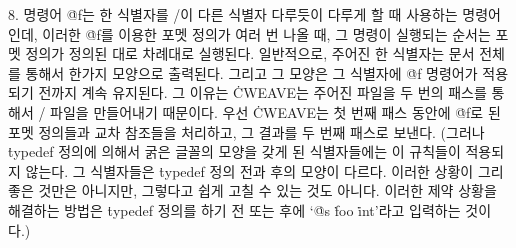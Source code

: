 8. 명령어 \.{@f}는 한 식별자를 \TEX/이 다른 식별자 다루듯이 다루게 할 때 사용하는
명령어인데, 이러한 \.{@f}를 이용한 포멧 정의가  여러 번 나올 때, 그 명령이 실행되는 순서는
포멧 정의가 정의된 대로 차례대로 실행된다. 일반적으로, 주어진 한 식별자는 문서 전체를 통해서
한가지 모양으로 출력된다. 그리고 그 모양은 그 식별자에 \.{@f} 명령어가 적용되기 전까지 계속
유지된다. 그 이유는 \.{CWEAVE}는 주어진 파일을 두 번의 패스를 통해서 \TEX/ 파일을
만들어내기 때문이다. 우선 \.{CWEAVE}는 첫 번째 패스 동안에 \.{@f}로 된 포멧 정의들과
교차 참조들을 처리하고, 그 결과를 두 번째 패스로 보낸다. (그러나 \.{typedef} 정의에 의해서
굵은 글꼴의 모양을 갖게 된 식별자들에는 이 규칙들이 적용되지 않는다. 그 식별자들은
\.{typedef} 정의 전과 후의 모양이 다르다. 이러한 상황이 그리 좋은 것만은 아니지만, 그렇다고
쉽게 고칠 수 있는 것도 아니다. 이러한 제약 상황을 해결하는 방법은 \.{typedef} 정의를 하기 전
또는 후에 `\.{@s} \.{foo} \.{int}'라고 입력하는 것이다.)

